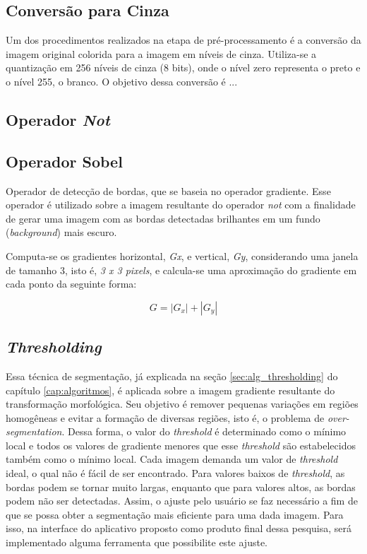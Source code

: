 \subsection*{Conversão para Cinza}
Um dos procedimentos realizados na etapa de pré-processamento é a conversão da imagem original colorida para a imagem em níveis de cinza. Utiliza-se a quantização em 256 níveis de cinza (8 bits), onde o nível zero representa o preto e o nível 255, o branco.
O objetivo dessa conversão é ...   

\subsection*{Operador \textit{Not}}

\subsection*{Operador Sobel}
Operador de detecção de bordas, que se baseia no operador gradiente. Esse operador é utilizado sobre a imagem resultante do operador \textit{not} com a finalidade de gerar uma imagem com as bordas detectadas brilhantes em um fundo (\textit{background}) mais escuro.

Computa-se os gradientes horizontal, \textit{Gx}, e vertical, \textit{Gy}, considerando uma janela de tamanho 3, isto é, \textit{3 x 3 pixels}, e calcula-se uma aproximação do gradiente em cada ponto da seguinte forma:

\[G = |G_{x}| + |G_{y}|\]


\subsection*{\textit{Thresholding}}
Essa técnica de segmentação, já explicada na seção \ref{sec:alg_thresholding} do capítulo \ref{cap:algoritmos}, é aplicada sobre a imagem gradiente resultante do transformação morfológica. Seu objetivo é remover pequenas variações em regiões homogêneas e evitar a formação de diversas regiões, isto é, o problema de \textit{over-segmentation}. Dessa forma, o valor do \textit{threshold} é determinado como o mínimo local e todos os valores de gradiente menores que esse \textit{threshold} são estabelecidos também como o mínimo local.
Cada imagem demanda um valor de \textit{threshold} ideal, o qual não é fácil de ser encontrado. Para valores baixos de \textit{threshold}, as bordas podem se tornar muito largas, enquanto que para valores altos, as bordas podem não ser detectadas.
Assim, o ajuste pelo usuário se faz necessário a fim de que se possa obter a segmentação mais eficiente para uma dada imagem. Para isso, na interface do aplicativo proposto como produto final dessa pesquisa, será implementado alguma ferramenta que possibilite este ajuste.


